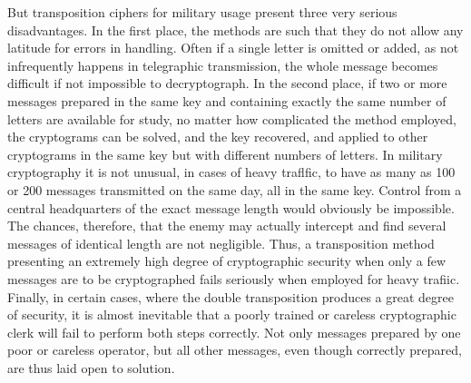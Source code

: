 \mypara But transposition ciphers for military usage present three very
serious disadvantages. In the first place, the methods are such that they
do not allow any latitude for errors in handling. Often if a single letter
is omitted or added, as not infrequently happens in telegraphic transmission, the whole message becomes difficult if not impossible to decryptograph. In the second place, if two or more messages prepared in the
same key and containing exactly the same number of letters are available
for study, no matter how complicated the method employed, the cryptograms can be solved, and the key recovered, and applied to other
cryptograms in the same key but with different numbers of letters. In
military cryptography it is not unusual, in cases of heavy traﬂfic, to have
as many as 100 or 200 messages transmitted on the same day, all in the
same key. Control from a central headquarters of the exact message
length would obviously be impossible. The chances, therefore, that the
enemy may actually intercept and find several messages of identical
length are not negligible. Thus, a transposition method presenting an
extremely high degree of cryptographic security when only a few
messages are to be cryptographed fails seriously when employed for
heavy trafiic. Finally, in certain cases, where the double transposition
produces a great degree of security, it is almost inevitable that a poorly
trained or careless cryptographic clerk will fail to perform both steps
correctly. Not only messages prepared by one poor or careless operator,
but all other messages, even though correctly prepared, are thus laid
open to solution.
